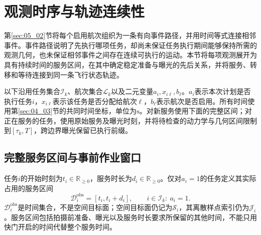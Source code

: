 \section{观测时序与轨迹连续性}
\label{sec:05_03}

第\ref{sec:05_02}节将每个启用航次组织为一条有向事件路径，并用时间等式连接相邻事件。事件路径说明了先执行哪项任务，却尚未保证任务执行期间能够保持所需的观测几何，也未保证相邻事件之间存在连续可执行的运动。本节将每项观测展开为具有持续时间的服务区间，在其中确定稳定准备与曝光的先后关系，并将服务、转移和等待连接到同一条飞行状态轨迹。

以下沿用任务集合$\mathcal I_k$、航次集合$\mathcal L_k$以及二元变量$a_i,x_{i\ell},b_\ell$。$a_i$表示本次计划是否执行任务$i$，$x_{i\ell}$表示该任务是否分配给航次$\ell$，$b_\ell$表示航次是否启用。所有时间使用第\ref{sec:04_03}节的共同时间坐标，单位为$\mathrm{s}$。对新服务使用下面的完整区间；对正在服务的任务，使用原始服务及曝光时刻，并将待检查的动力学与几何区间限制到$[\tau_k,T]$，跨边界曝光保留已执行前缀。

\subsection{完整服务区间与事前作业窗口}

任务$i$的开始时刻为$t_i\in\mathbb R_{\ge0}$，服务时长为$d_i\in\mathbb R_{\ge0}$。仅对$a_i=1$的任务定义其实际占用的服务区间
\begin{equation}
 \mathcal D_i^{\mathrm{obs}}=[t_i,t_i+d_i],
 \qquad i\in\mathcal I_k:\ a_i=1.
 \label{s0503:service_interval}
\end{equation}
$\mathcal D_i^{\mathrm{obs}}$是时间集合，不是空间目标面；空间目标面仍记为$\mathcal S_i$，其离散样点索引仍为$\mathcal J_i$。服务区间包括拍摄前准备、曝光以及服务时长要求所保留的其他时间，不能只用快门开启的时间代替整个服务时间。

